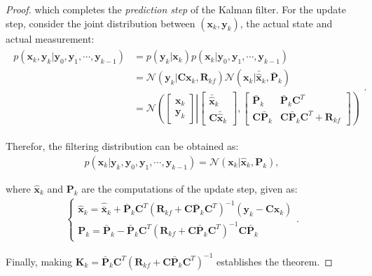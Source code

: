 \documentclass[a4paper,11pt]{book}
\numberwithin{figure}{chapter}
\numberwithin{equation}{chapter}
\numberwithin{table}{chapter}
\theoremstyle{definition}
\begin{document}
\begin{proof}
    \noindent which completes the \textit{prediction step} of the Kalman filter. For the update step, consider the joint distribution between $(\bm{x}_k, \bm{y}_k)$, the actual state and actual measurement:
    \begin{align}
    \begin{split}
        p(\bm{x}_k, \bm{y}_{k} | \bm{y}_0, \bm{y}_1, \cdots, \bm{y}_{k-1}) &= p(\bm{y}_k | \bm{x}_{k}) p(\bm{x}_{k} | \bm{y}_0, \bm{y}_1, \cdots, \bm{y}_{k-1}) \\
        &= \mathcal{N}(\bm{y}_k | \bm{C}\bm{x}_{k}, \bm{R}_{kf}) \mathcal{N}(\bm{x}_{k} | \bar{\hat{\bm{x}}}_k, \bar{\bm{P}}_k) \\
        &= \mathcal{N}\left( \begin{bmatrix} \bm{x}_{k} \\ \bm{y}_{k} \end{bmatrix}  \right| \left. \begin{bmatrix} \bar{\hat{\bm{x}}}_k \\ \bm{C}\bar{\hat{\bm{x}}}_k \end{bmatrix}, \begin{bmatrix} \bar{\bm{P}}_k & \bar{\bm{P}}_k \bm{C}^T  \\ \bm{C} \bar{\bm{P}}_k & \bm{C} \bar{\bm{P}}_k \bm{C}^T + \bm{R}_{kf} \end{bmatrix}   \right)
    \end{split}
    .\end{align}
    
    Therefor, the filtering distribution can be obtained as:
    \begin{align}
        p(\bm{x}_k | \bm{y}_k, \bm{y}_0, \bm{y}_1, \cdots, \bm{y}_{k-1}) = \mathcal{N}(\bm{x}_k | \hat{\bm{x}}_k, \bm{P}_k)
    ,\end{align}

    \noindent where $\hat{\bm{x}}_k$ and $\bm{P}_k$ are the computations of the update step, given as:
    \begin{align}
    \begin{cases}
        \hat{\bm{x}}_k = \hat{\bar{\bm{x}}}_k + \bar{\bm{P}}_k \bm{C}^T (\bm{R}_{kf} + \bm{C} \bar{\bm{P}}_k \bm{C}^T)^{-1}(\bm{y}_k - \bm{C}\bm{x}_k) \\
        \bm{P}_k = \bar{\bm{P}}_k - \bar{\bm{P}}_k \bm{C}^T (\bm{R}_{kf} + \bm{C} \bar{\bm{P}}_k \bm{C}^T)^{-1} \bm{C} \bar{\bm{P}}_k
    \end{cases}
    .\end{align}
    
    Finally, making $\bm{K}_k = \bar{\bm{P}}_k \bm{C}^T (\bm{R}_{kf} + \bm{C} \bar{\bm{P}}_k \bm{C}^T)^{-1}$ establishes the theorem.
\end{proof}
\end{document}
